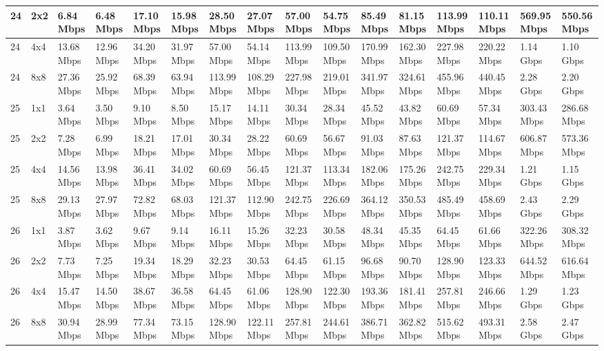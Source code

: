 \documentclass[12pt]{article}
\begin{document}
\begin{longtable}[c]{|l|l|l|l|l|l|l|l|l|l|l|l|l|l|l|l|}
24 & 2x2 & 6.84 Mbps & 6.48 Mbps & 17.10 Mbps & 15.98 Mbps & 28.50 Mbps & 27.07 Mbps & 57.00 Mbps & 54.75 Mbps & 85.49 Mbps & 81.15 Mbps & 113.99 Mbps & 110.11 Mbps & 569.95 Mbps & 550.56 Mbps \\ \hline
24 & 4x4 & 13.68 Mbps & 12.96 Mbps & 34.20 Mbps & 31.97 Mbps & 57.00 Mbps & 54.14 Mbps & 113.99 Mbps & 109.50 Mbps & 170.99 Mbps & 162.30 Mbps & 227.98 Mbps & 220.22 Mbps & 1.14 Gbps & 1.10 Gbps \\ \hline
24 & 8x8 & 27.36 Mbps & 25.92 Mbps & 68.39 Mbps & 63.94 Mbps & 113.99 Mbps & 108.29 Mbps & 227.98 Mbps & 219.01 Mbps & 341.97 Mbps & 324.61 Mbps & 455.96 Mbps & 440.45 Mbps & 2.28 Gbps & 2.20 Gbps \\ \hline
25 & 1x1 & 3.64 Mbps & 3.50 Mbps & 9.10 Mbps & 8.50 Mbps & 15.17 Mbps & 14.11 Mbps & 30.34 Mbps & 28.34 Mbps & 45.52 Mbps & 43.82 Mbps & 60.69 Mbps & 57.34 Mbps & 303.43 Mbps & 286.68 Mbps \\ \hline
25 & 2x2 & 7.28 Mbps & 6.99 Mbps & 18.21 Mbps & 17.01 Mbps & 30.34 Mbps & 28.22 Mbps & 60.69 Mbps & 56.67 Mbps & 91.03 Mbps & 87.63 Mbps & 121.37 Mbps & 114.67 Mbps & 606.87 Mbps & 573.36 Mbps \\ \hline
25 & 4x4 & 14.56 Mbps & 13.98 Mbps & 36.41 Mbps & 34.02 Mbps & 60.69 Mbps & 56.45 Mbps & 121.37 Mbps & 113.34 Mbps & 182.06 Mbps & 175.26 Mbps & 242.75 Mbps & 229.34 Mbps & 1.21 Gbps & 1.15 Gbps \\ \hline
25 & 8x8 & 29.13 Mbps & 27.97 Mbps & 72.82 Mbps & 68.03 Mbps & 121.37 Mbps & 112.90 Mbps & 242.75 Mbps & 226.69 Mbps & 364.12 Mbps & 350.53 Mbps & 485.49 Mbps & 458.69 Mbps & 2.43 Gbps & 2.29 Gbps \\ \hline
26 & 1x1 & 3.87 Mbps & 3.62 Mbps & 9.67 Mbps & 9.14 Mbps & 16.11 Mbps & 15.26 Mbps & 32.23 Mbps & 30.58 Mbps & 48.34 Mbps & 45.35 Mbps & 64.45 Mbps & 61.66 Mbps & 322.26 Mbps & 308.32 Mbps \\ \hline
26 & 2x2 & 7.73 Mbps & 7.25 Mbps & 19.34 Mbps & 18.29 Mbps & 32.23 Mbps & 30.53 Mbps & 64.45 Mbps & 61.15 Mbps & 96.68 Mbps & 90.70 Mbps & 128.90 Mbps & 123.33 Mbps & 644.52 Mbps & 616.64 Mbps \\ \hline
26 & 4x4 & 15.47 Mbps & 14.50 Mbps & 38.67 Mbps & 36.58 Mbps & 64.45 Mbps & 61.06 Mbps & 128.90 Mbps & 122.30 Mbps & 193.36 Mbps & 181.41 Mbps & 257.81 Mbps & 246.66 Mbps & 1.29 Gbps & 1.23 Gbps \\ \hline
26 & 8x8 & 30.94 Mbps & 28.99 Mbps & 77.34 Mbps & 73.15 Mbps & 128.90 Mbps & 122.11 Mbps & 257.81 Mbps & 244.61 Mbps & 386.71 Mbps & 362.82 Mbps & 515.62 Mbps & 493.31 Mbps & 2.58 Gbps & 2.47 Gbps \\ \hline

\end{longtable}
\end{document}
